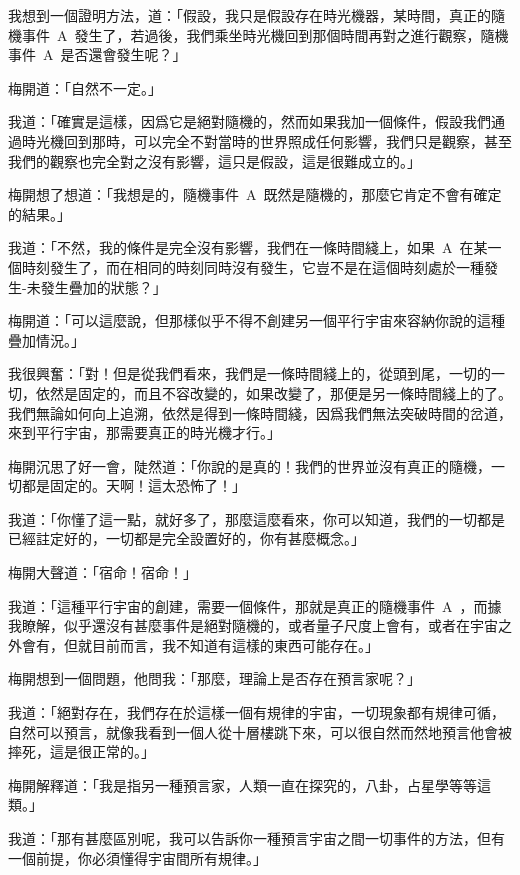 我想到一個證明方法，道：「假設，我只是假設存在時光機器，某時間，真正的隨機事件~A~發生了，若過後，我們乘坐時光機回到那個時間再對之進行觀察，隨機事件~A~是否還會發生呢？」

梅開道：「自然不一定。」

我道：「確實是這樣，因爲它是絕對隨機的，然而如果我加一個條件，假設我們通過時光機回到那時，可以完全不對當時的世界照成任何影響，我們只是觀察，甚至我們的觀察也完全對之沒有影響，這只是假設，這是很難成立的。」

梅開想了想道：「我想是的，隨機事件~A~既然是隨機的，那麼它肯定不會有確定的結果。」

我道：「不然，我的條件是完全沒有影響，我們在一條時間綫上，如果~A~在某一個時刻發生了，而在相同的時刻同時沒有發生，它豈不是在這個時刻處於一種發生-未發生疊加的狀態？」

梅開道：「可以這麼說，但那樣似乎不得不創建另一個平行宇宙來容納你說的這種疊加情況。」

我很興奮：「對！但是從我們看來，我們是一條時間綫上的，從頭到尾，一切的一切，依然是固定的，而且不容改變的，如果改變了，那便是另一條時間綫上的了。我們無論如何向上追溯，依然是得到一條時間綫，因爲我們無法突破時間的岔道，來到平行宇宙，那需要真正的時光機才行。」

梅開沉思了好一會，陡然道：「你說的是真的！我們的世界並沒有真正的隨機，一切都是固定的。天啊！這太恐怖了！」

我道：「你懂了這一點，就好多了，那麼這麼看來，你可以知道，我們的一切都是已經註定好的，一切都是完全設置好的，你有甚麼概念。」

梅開大聲道：「宿命！宿命！」

我道：「這種平行宇宙的創建，需要一個條件，那就是真正的隨機事件~A~，而據我瞭解，似乎還沒有甚麼事件是絕對隨機的，或者量子尺度上會有，或者在宇宙之外會有，但就目前而言，我不知道有這樣的東西可能存在。」

梅開想到一個問題，他問我：「那麼，理論上是否存在預言家呢？」

我道：「絕對存在，我們存在於這樣一個有規律的宇宙，一切現象都有規律可循，自然可以預言，就像我看到一個人從十層樓跳下來，可以很自然而然地預言他會被摔死，這是很正常的。」

梅開解釋道：「我是指另一種預言家，人類一直在探究的，八卦，占星學等等這類。」

我道：「那有甚麼區別呢，我可以告訴你一種預言宇宙之間一切事件的方法，但有一個前提，你必須懂得宇宙間所有規律。」


